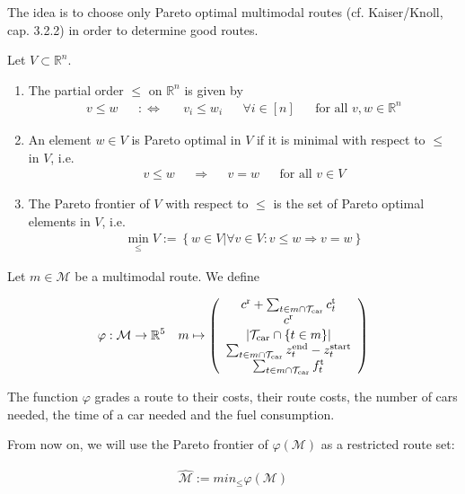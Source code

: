 The idea is to choose only Pareto optimal multimodal routes (cf. Kaiser/Knoll, cap. 3.2.2) in order to determine good routes.

\begin{definition}

Let $V\subset\mathbb{R}^n$.

\begin{enumerate}
	\item{The partial order $\leq$ on $\mathbb{R}^n$ is given by
		\begin{align*}
			v\leq w && :\Leftrightarrow && v_i\leq w_i && \forall i\in[n] && \text{for all }v,w\in\mathbb{R}^n
		\end{align*}}
	\item{An element $w\in V$ is Pareto optimal in $V$ if it is minimal with respect to $\leq$ in $V$, i.e.
		\begin{align*}
			v\leq w && \Rightarrow && v=w && \text{for all } v\in V
		\end{align*}}
	\item{The Pareto frontier of $V$ with respect to $\leq$ is the set of Pareto optimal elements in $V$, i.e.
		\begin{align*}
			\operatorname{min}_{\leq} V := \left\{w\in V|\forall v\in V: v\leq w \Rightarrow v=w\right\}
		\end{align*}}
\end{enumerate}

\end{definition}

Let $m\in\mathcal{M}$ be a multimodal route. We define

\begin{align*}
	\varphi:\mathcal{M}\to\mathbb{R}^5 && m\mapsto\left(
	\begin{array}{c}
		c^{\operatorname{r}} + \sum_{t\in m\cap\mathcal{T}_{\operatorname{car}}}c^{\operatorname{t}}_t \\
		c^{\operatorname{r}} \\
		|\mathcal{T}_{\operatorname{car}}\cap\{t\in m\}|\\
		\sum_{t\in m\cap\mathcal{T}_{\operatorname{car}}} z^{\operatorname{end}}_t - z^{\operatorname{start}}_t \\
		\sum_{t\in m\cap\mathcal{T}_{\operatorname{car}}} f^{\operatorname{t}}_t
	\end{array} \right)
\end{align*}

The function $\varphi$ grades a route to their costs, their route costs, the number of cars needed, the time of a car needed and the fuel consumption.

From now on, we will use the Pareto frontier of $\varphi\left(\mathcal{M}\right)$ as a restricted route set:

\begin{align}
	\hat{\mathcal{M}} := min_{\leq} \varphi\left(\mathcal{M}\right)
\end{align}
